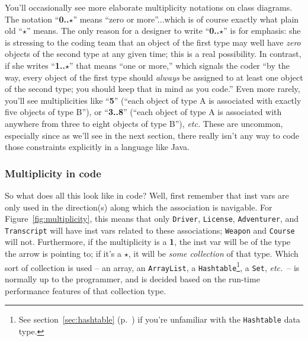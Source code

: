 You'll occasionally see more elaborate multiplicity notations on class
diagrams. The notation ``\textbf{0..$\star$}'' means ``zero or more''...which is
of course exactly what plain old ``$\star$'' means. The only reason for a
designer to write ``\textbf{0..$\star$}'' is for emphasis: she is stressing to
the coding team that an object of the first type may well have \textit{zero}
objects of the second type at any given time; this is a real possibility. In
contrast, if she writes ``\textbf{1..$\star$}'' that means ``one or more,''
which signals the coder ``by the way, every object of the first type should
\textit{always} be assigned to at least one object of the second type; you
should keep that in mind as you code.'' Even more rarely, you'll see
multiplicities like ``\textbf{5}'' (``each object of type A is associated with
exactly five objects of type B''), or ``\textbf{3..8}'' (``each object of type A
is associated with anywhere from three to eight objects of type B''),
\textit{etc.} These are uncommon, especially since as we'll see in the next
section, there really isn't any way to code those constraints explicitly in a
language like Java.



\subsubsection{Multiplicity in code}


So what does all this look like in code? Well, first remember that inst vars
are only used in the direction(s) along which the association is navigable. For
Figure~\ref{fig:multiplicity}, this means that only \texttt{Driver},
\texttt{License}, \texttt{Adventurer}, and \texttt{Transcript} will have inst
vars related to these associations; \texttt{Weapon} and \texttt{Course} will
not. Furthermore, if the multiplicity is a \textbf{1}, the inst var will be of
the type the arrow is pointing to; if it's a $\star$, it will be \textit{some
collection} of that type. Which sort of collection is used -- an array, an
\texttt{ArrayList}, a \texttt{Hashtable}\footnote{See
section~\ref{sec:hashtable} (p.~\pageref{sec:hashtable}) if you're unfamiliar
with the \texttt{Hashtable} data type.}, a \texttt{Set},
\textit{etc.}~-- is normally up to the programmer, and is decided based on the
run-time performance features of that collection type.

